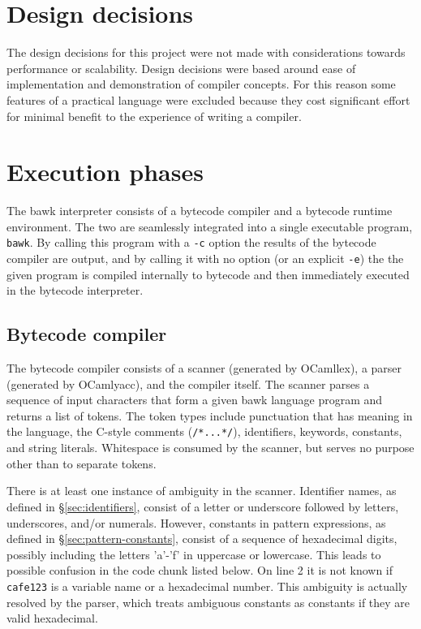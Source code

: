\section{Design decisions}
The design decisions for this project were not made with considerations towards performance or scalability.  Design decisions were based around ease of implementation and demonstration of compiler concepts.  For this reason some features of a practical language were excluded because they cost significant effort for minimal benefit to the experience of writing a compiler.

\section{Execution phases}
The bawk interpreter consists of a bytecode compiler and a bytecode runtime environment.  The two are seamlessly integrated into a single executable program, \texttt{bawk}.  By calling this program with a \texttt{-c} option the results of the bytecode compiler are output, and by calling it with no option (or an explicit \texttt{-e}) the the given program is compiled internally to bytecode and then immediately executed in the bytecode interpreter.

\subsection{Bytecode compiler}
\label{sec:bytecode-compiler}
The bytecode compiler consists of a scanner (generated by OCamllex), a parser (generated by OCamlyacc), and the compiler itself.  The scanner parses a sequence of input characters that form a given bawk language program and returns a list of tokens.  The token types include punctuation that has meaning in the language, the C-style comments (\texttt{/*...*/}), identifiers, keywords, constants, and string literals.  Whitespace is consumed by the scanner, but serves no purpose other than to separate tokens.

There is at least one instance of ambiguity in the scanner.  Identifier names, as defined in \S\ref{sec:identifiers}, consist of a letter or underscore followed by letters, underscores, and/or numerals.  However, constants in pattern expressions, as defined in \S\ref{sec:pattern-constants}, consist of a sequence of hexadecimal digits, possibly including the letters 'a'-'f' in uppercase or lowercase.  This leads to possible confusion in the code chunk listed below.  On line 2 it is not known if \texttt{cafe123} is a variable name or a hexadecimal number.  This ambiguity is actually resolved by the parser, which treats ambiguous constants as constants if they are valid hexadecimal.


